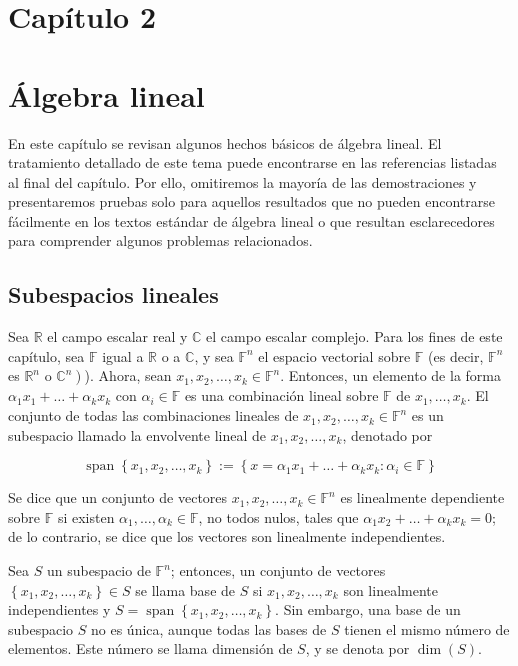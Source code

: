 \documentclass[11pt]{article}
\begin{document}
\section*{Capítulo 2}

\section*{Álgebra lineal}
En este capítulo se revisan algunos hechos básicos de álgebra lineal. El tratamiento detallado de este tema puede encontrarse en las referencias listadas al final del capítulo. Por ello, omitiremos la mayoría de las demostraciones y presentaremos pruebas solo para aquellos resultados que no pueden encontrarse fácilmente en los textos estándar de álgebra lineal o que resultan esclarecedores para comprender algunos problemas relacionados.

\subsection*{Subespacios lineales}
Sea $\mathbb{R}$ el campo escalar real y $\mathbb{C}$ el campo escalar complejo. Para los fines de este capítulo, sea $\mathbb{F}$ igual a $\mathbb{R}$ o a $\mathbb{C}$, y sea $\mathbb{F}^{n}$ el espacio vectorial sobre $\mathbb{F}$ (es decir, $\mathbb{F}^{n}$ es $\mathbb{R}^{n}$ o $\left.\mathbb{C}^{n}\right)$). Ahora, sean $x_{1}, x_{2}, \ldots, x_{k} \in \mathbb{F}^{n}$. Entonces, un elemento de la forma $\alpha_{1} x_{1}+\ldots+\alpha_{k} x_{k}$ con $\alpha_{i} \in \mathbb{F}$ es una combinación lineal sobre $\mathbb{F}$ de $x_{1}, \ldots, x_{k}$. El conjunto de todas las combinaciones lineales de $x_{1}, x_{2}, \ldots, x_{k} \in \mathbb{F}^{n}$ es un subespacio llamado la envolvente lineal de $x_{1}, x_{2}, \ldots, x_{k}$, denotado por

$$
\operatorname{span}\left\{x_{1}, x_{2}, \ldots, x_{k}\right\}:=\left\{x=\alpha_{1} x_{1}+\ldots+\alpha_{k} x_{k}: \alpha_{i} \in \mathbb{F}\right\}
$$

Se dice que un conjunto de vectores $x_{1}, x_{2}, \ldots, x_{k} \in \mathbb{F}^{n}$ es linealmente dependiente sobre $\mathbb{F}$ si existen $\alpha_{1}, \ldots, \alpha_{k} \in \mathbb{F}$, no todos nulos, tales que $\alpha_{1} x_{2}+\ldots+\alpha_{k} x_{k}=0$; de lo contrario, se dice que los vectores son linealmente independientes.

Sea $S$ un subespacio de $\mathbb{F}^{n}$; entonces, un conjunto de vectores $\left\{x_{1}, x_{2}, \ldots, x_{k}\right\} \in S$ se llama base de $S$ si $x_{1}, x_{2}, \ldots, x_{k}$ son linealmente independientes y $S=\operatorname{span}\left\{x_{1}, x_{2}, \ldots, x_{k}\right\}$. Sin embargo, una base de un subespacio $S$ no es única, aunque todas las bases de $S$ tienen el mismo número de elementos. Este número se llama dimensión de $S$, y se denota por $\operatorname{dim}(S)$.
\end{document}
